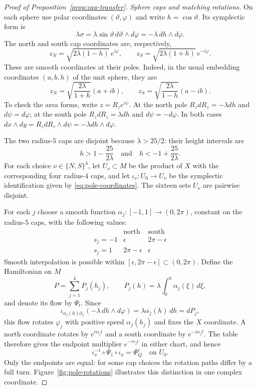 \begin{proof}[Proof of Proposition~\ref{prop:cap-transfer}]
\smallskip
\noindent\emph{Sphere caps and matching rotations.}
On each sphere use polar coordinates $(\vartheta,\varphi)$ and write
$h=\cos\vartheta$.  Its symplectic form is
\[
 \lambda\sigma
 =\lambda\sin\vartheta\,d\vartheta\wedge d\varphi
 =-\lambda\,dh\wedge d\varphi.
\]
The north and south cap coordinates are, respectively,
\begin{equation}\label{eq:pole-coordinates}
 z_N=\sqrt{2\lambda(1-h)}\,e^{i\varphi},
 \qquad
 z_S=\sqrt{2\lambda(1+h)}\,e^{-i\varphi}.
\end{equation}
These are smooth coordinates at their poles.  Indeed, in the usual
embedding coordinates $(a,b,h)$ of the unit sphere, they are
\[
 z_N=\sqrt{\frac{2\lambda}{1+h}}(a+ib),
 \qquad
 z_S=\sqrt{\frac{2\lambda}{1-h}}(a-ib).
\]
To check the area forms, write $z=R_ze^{i\psi}$.  At the north pole
$R_zdR_z=-\lambda dh$ and $d\psi=d\varphi$; at the south pole
$R_zdR_z=\lambda dh$ and $d\psi=-d\varphi$.  In both cases
$dx\wedge dy=R_zdR_z\wedge d\psi=-\lambda dh\wedge d\varphi$.

The two radius-$5$ caps are disjoint because $\lambda>25/2$:
their height intervals are
\[
 h>1-\frac{25}{2\lambda}
 \quad\text{and}\quad
 h<-1+\frac{25}{2\lambda}.
\]
For each choice $\nu\in\{N,S\}^4$, let $U_\nu\subset M$ be the
product of $X$ with the corresponding four radius-$4$ caps, and let
$\iota_\nu\colon U_0\to U_\nu$ be the symplectic identification
given by \eqref{eq:pole-coordinates}.  The sixteen sets $U_\nu$ are
pairwise disjoint.

For each $j$ choose a smooth function
$\alpha_j\colon[-1,1]\to(0,2\pi)$, constant on the radius-$5$ caps,
with the following values:
\[
\begin{array}{c|cc}
 &\text{north}&\text{south}\\ \hline
 s_j=-1&\epsilon&2\pi-\epsilon\\
 s_j=1&2\pi-\epsilon&\epsilon
\end{array}
\]
Smooth interpolation is possible within
$[\epsilon,2\pi-\epsilon]\subset(0,2\pi)$.
Define the Hamiltonian on $M$
\[
 P=\sum_{j=1}^4P_j(h_j),\qquad
 P_j(h)=\lambda\int_0^h\alpha_j(\xi)\,d\xi,
\]
and denote its flow by $\Psi_t$.  Since
\[
 \iota_{\alpha_j(h)\partial_\varphi}
       (-\lambda\,dh\wedge d\varphi)
 =\lambda\alpha_j(h)\,dh=dP_j,
\]
this flow rotates $\varphi_j$ with positive speed $\alpha_j(h_j)$
and fixes the $X$ coordinate.  A north coordinate rotates by
$e^{i\alpha_jt}$ and a south coordinate by $e^{-i\alpha_jt}$.
The table therefore gives the endpoint multiplier $e^{-is_j\epsilon}$
in either chart, and hence
\begin{equation}\label{eq:cap-endpoint-match}
 \iota_\nu^{-1}\circ\Psi_1\circ\iota_\nu=\Phi_Q^\epsilon
 \quad\text{on }U_0.
\end{equation}
Only the endpoints are equal: for some cap choices the rotation paths
differ by a full turn. Figure~\ref{fig:pole-rotations} illustrates this
distinction in one complex coordinate.


\end{proof}
